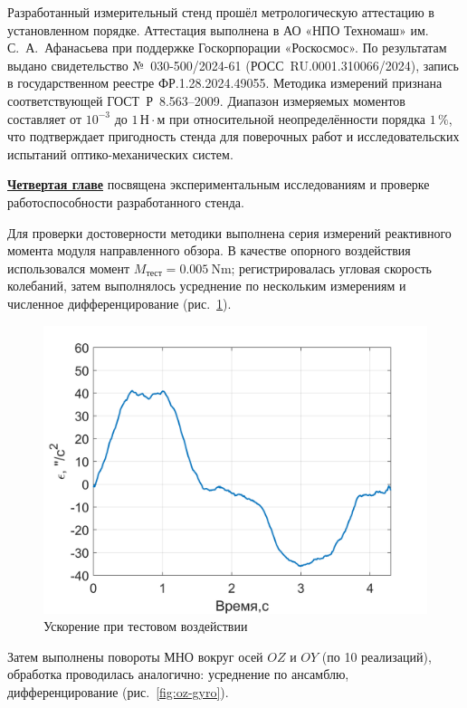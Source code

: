 Разработанный измерительный стенд прошёл метрологическую аттестацию
в установленном порядке. Аттестация выполнена в АО «НПО Техномаш»
им. С.~А.~Афанасьева при поддержке Госкорпорации «Роскосмос».
По результатам выдано свидетельство №~030-500/2024-61
(РОСС~RU.0001.310066/2024), запись в государственном реестре
ФР.1.28.2024.49055. Методика измерений признана соответствующей
ГОСТ~Р~8.563–2009. Диапазон измеряемых моментов составляет
от $10^{-3}$ до $1\,\text{Н}\cdot\text{м}$ при относительной
неопределённости порядка $1\,\%$, что подтверждает пригодность стенда
для поверочных работ и исследовательских испытаний оптико-механических систем.

\underline{\textbf{Четвертая главе}} посвящена экспериментальным исследованиям и проверке работоспособности разработанного стенда.

Для проверки достоверности методики выполнена серия измерений реактивного момента модуля направленного обзора.
В качестве опорного воздействия использовался момент $M_{\text{тест}}=\SI{0.005}{\newton\meter}$;
регистрировалась угловая скорость колебаний, затем выполнялось усреднение по нескольким измерениям и численное дифференцирование (рис.~\cref{fig:test-gyro-acc}).

\begin{figure}[h!]
	\centering
	\includegraphics[scale=0.3]{matlab/img/test-gyro-acc}
	\caption{Ускорение при тестовом воздействии}
	\label{fig:test-gyro-acc}
\end{figure}

Затем выполнены повороты МНО вокруг осей $OZ$ и $OY$ (по 10 реализаций), обработка проводилась аналогично:
усреднение по ансамблю, дифференцирование
(рис.~\cref{fig:oz-gyro}).

